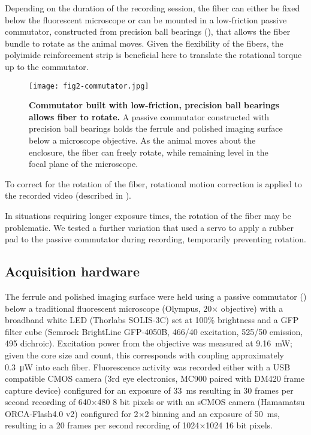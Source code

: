 Depending on the duration of the recording session, the 
fiber can either be fixed below the fluorescent microscope 
or can be mounted in a low-friction passive commutator,
constructed from precision ball bearings (), that allows 
the fiber bundle to rotate as the animal moves. Given the 
flexibility of the fibers, the polyimide reinforcement 
strip is beneficial here to translate the rotational 
torque up to the commutator.

\begin{figure}
\texttt{[image: fig2-commutator.jpg]}
\caption[Commutator for awake behaving recording]{\textbf{Commutator
built with low-friction, precision ball bearings allows fiber to 
rotate.} A passive commutator constructed with precision ball 
bearings holds the ferrule and polished imaging surface below 
a microscope objective. As the animal moves about the enclosure,
the fiber can freely rotate, while remaining level in the focal 
plane of the microscope.}
\label{fig:commutator}
\end{figure}

To correct for the rotation of the fiber, rotational 
motion correction is applied to the recorded video 
(described in ).

In situations requiring longer exposure times, the 
rotation of the fiber may be problematic. We tested a 
further variation that used a servo to apply a rubber pad 
to the passive commutator during recording, temporarily 
preventing rotation.

\subsection{Acquisition hardware}

The ferrule and polished imaging surface were held 
using a passive commutator () 
below a traditional fluorescent microscope (Olympus, 
20$\times$ objective) with a broadband white LED 
(Thorlabs SOLIS-3C) set at 100\% brightness and 
a GFP filter cube (Semrock BrightLine GFP-4050B, 
466/40 excitation, 525/50 emission, 495 dichroic). 
Excitation power from the objective was measured 
at 9.16~mW; given the core size and count, this 
corresponds with coupling approximately 
0.3~\si{\micro\watt} into each 
fiber. Fluorescence activity was recorded either 
with a USB compatible CMOS camera (3rd eye 
electronics, MC900 paired with DM420 frame capture 
device) configured for an exposure of 33~ms resulting 
in 30 frames per second recording of 640$\times$480 
8 bit pixels or with an 
sCMOS camera (Hamamatsu ORCA-Flash4.0 v2) configured 
for 2$\times$2 binning and an exposure of 50~ms, 
resulting in a 20 frames per second recording of 
1024$\times$1024 16 bit pixels.

